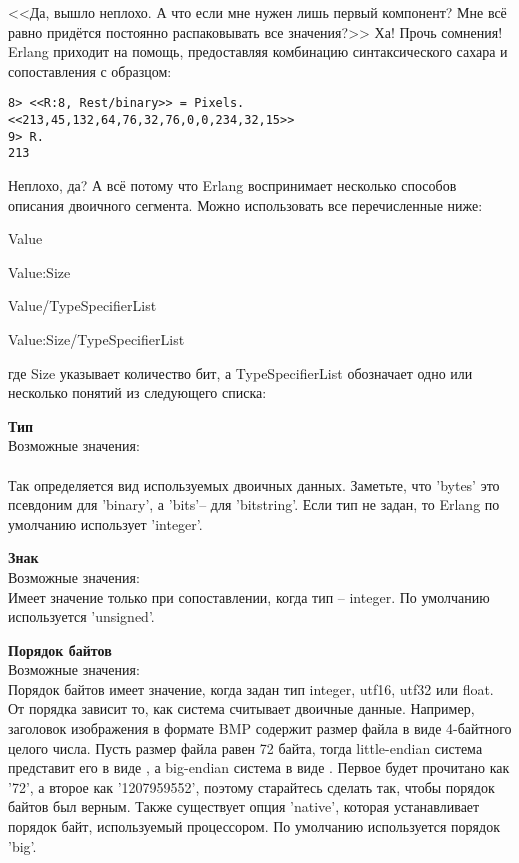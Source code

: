 <<Да, вышло неплохо.
А что если мне нужен лишь первый компонент?
Мне всё равно придётся постоянно распаковывать все значения?>>
Ха!
Прочь сомнения!
Erlang приходит на помощь, предоставляя комбинацию синтаксического сахара и сопоставления с образцом:
\begin{lstlisting}[style=repl]
8> <<R:8, Rest/binary>> = Pixels.
<<213,45,132,64,76,32,76,0,0,234,32,15>>
9> R.
213
\end{lstlisting}

Неплохо, да?
А всё потому что Erlang воспринимает несколько способов описания двоичного сегмента.
Можно использовать все перечисленные ниже:

Value

Value:Size

Value/TypeSpecifierList

Value:Size/TypeSpecifierList

где Size указывает количество бит, а TypeSpecifierList обозначает одно или несколько понятий из следующего списка:

\begin{minipage}{\textwidth}
\textbf{Тип}\\ 
Возможные значения: \\ 
\\  
Так определяется вид используемых двоичных данных.
Заметьте, что 'bytes' это псевдоним для 'binary', а 'bits'\--- для 'bitstring'.
Если тип не задан, то Erlang по умолчанию использует 'integer'.\\ 
\end{minipage}

\begin{minipage}{\textwidth}
    \textbf{Знак}\\ 
    Возможные значения: \\ 
    Имеет значение только при сопоставлении, когда тип \--- integer.
    По умолчанию используется 'unsigned'.\\ 
\end{minipage}

\begin{minipage}{\textwidth}
    \textbf{Порядок байтов}\\ 
    Возможные значения: \\ 
    Порядок байтов имеет значение, когда задан тип integer, utf16, utf32 или float.
    От порядка зависит то, как система считывает двоичные данные.
    Например, заголовок изображения в формате BMP содержит размер файла в виде 4\--байтного целого числа.
    Пусть размер файла равен 72 байта, тогда little\--endian система представит его в виде , а big\--endian система в виде .
    Первое будет прочитано как '72', а второе как '1207959552', поэтому старайтесь сделать так, чтобы порядок байтов был верным.
    Также существует опция 'native', которая устанавливает порядок байт, используемый процессором.
    По умолчанию используется порядок 'big'.\\ 
\end{minipage}

